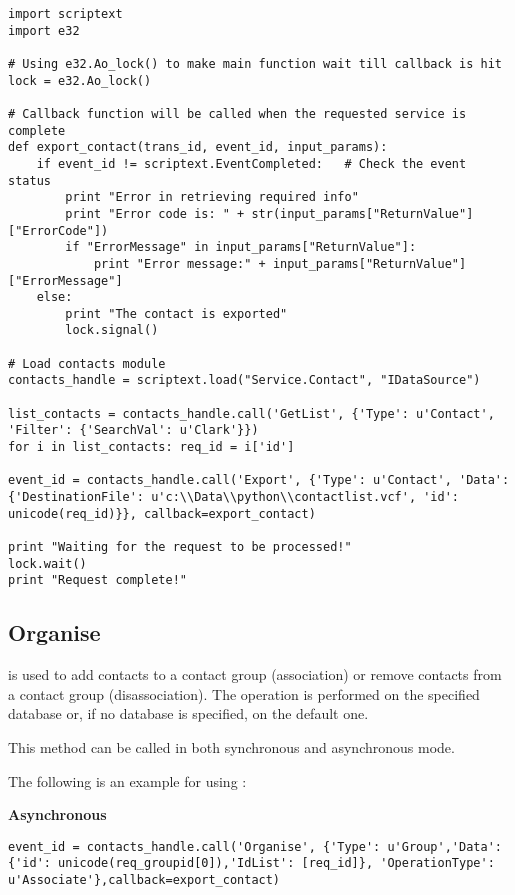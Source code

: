 \begin{verbatim}
import scriptext
import e32

# Using e32.Ao_lock() to make main function wait till callback is hit
lock = e32.Ao_lock()

# Callback function will be called when the requested service is complete
def export_contact(trans_id, event_id, input_params):
    if event_id != scriptext.EventCompleted:   # Check the event status
        print "Error in retrieving required info"
        print "Error code is: " + str(input_params["ReturnValue"]["ErrorCode"])
        if "ErrorMessage" in input_params["ReturnValue"]:
            print "Error message:" + input_params["ReturnValue"]["ErrorMessage"]
    else:
        print "The contact is exported"
        lock.signal()

# Load contacts module
contacts_handle = scriptext.load("Service.Contact", "IDataSource")

list_contacts = contacts_handle.call('GetList', {'Type': u'Contact', 'Filter': {'SearchVal': u'Clark'}})
for i in list_contacts: req_id = i['id']

event_id = contacts_handle.call('Export', {'Type': u'Contact', 'Data': {'DestinationFile': u'c:\\Data\\python\\contactlist.vcf', 'id': unicode(req_id)}}, callback=export_contact)

print "Waiting for the request to be processed!"
lock.wait()
print "Request complete!"
\end{verbatim}

\subsection{Organise}
\label{subsec:contactorg}

 is used to add contacts to a contact group (association) or remove contacts from a contact group (disassociation). The operation is performed on the specified database or, if no database is specified, on the default one. \break

This method can be called in both synchronous and asynchronous mode.

The following is an example for using :

{\bf Asynchronous} \break

\begin{verbatim}
event_id = contacts_handle.call('Organise', {'Type': u'Group','Data': {'id': unicode(req_groupid[0]),'IdList': [req_id]}, 'OperationType': u'Associate'},callback=export_contact)
\end{verbatim}

